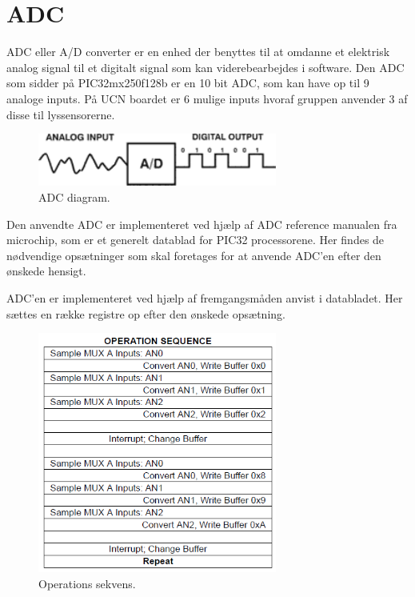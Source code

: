 \section{ADC}
ADC eller A/D converter er en enhed der benyttes til at omdanne et elektrisk analog signal til et digitalt signal som kan viderebearbejdes i software. 
Den ADC som sidder på PIC32mx250f128b er en 10 bit ADC, som kan have op til 9 analoge inputs. På UCN boardet er 6 mulige inputs hvoraf gruppen  anvender 3 af disse til lyssensorerne. 

\begin{figure}[h!]
  \centering
  \includegraphics[width=0.7\textwidth]{figures/A_D_converter.png}
  \caption{ADC diagram.\cite{ADC_figur}}
  \label{adcDiagram}
\end{figure} 
Den anvendte ADC er implementeret ved hjælp af ADC reference manualen fra microchip, som er et generelt datablad for PIC32 processorene. Her findes de nødvendige opsætninger som skal foretages for at anvende ADC'en efter den ønskede hensigt.
\newline

ADC'en er implementeret ved hjælp af fremgangsmåden anvist i databladet. Her sættes en række registre op efter den ønskede opsætning. 

\begin{figure}[h!]
  \centering
  \includegraphics[width=0.7\textwidth]{figures/operation_sequence.png}
  \caption{Operations sekvens.}
  \label{handlingsekvens}
\end{figure} 

